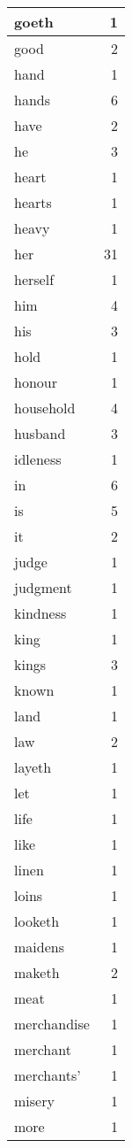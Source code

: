 \begin{center}
\begin{longtable}{l|r}
goeth & 1\\ \hline 
good & 2\\ \hline 
hand & 1\\ \hline 
hands & 6\\ \hline 
have & 2\\ \hline 
he & 3\\ \hline 
heart & 1\\ \hline 
hearts & 1\\ \hline 
heavy & 1\\ \hline 
her & 31\\ \hline 
herself & 1\\ \hline 
him & 4\\ \hline 
his & 3\\ \hline 
hold & 1\\ \hline 
honour & 1\\ \hline 
household & 4\\ \hline 
husband & 3\\ \hline 
idleness & 1\\ \hline 
in & 6\\ \hline 
is & 5\\ \hline 
it & 2\\ \hline 
judge & 1\\ \hline 
judgment & 1\\ \hline 
kindness & 1\\ \hline 
king & 1\\ \hline 
kings & 3\\ \hline 
known & 1\\ \hline 
land & 1\\ \hline 
law & 2\\ \hline 
layeth & 1\\ \hline 
let & 1\\ \hline 
life & 1\\ \hline 
like & 1\\ \hline 
linen & 1\\ \hline 
loins & 1\\ \hline 
looketh & 1\\ \hline 
maidens & 1\\ \hline 
maketh & 2\\ \hline 
meat & 1\\ \hline 
merchandise & 1\\ \hline 
merchant & 1\\ \hline 
merchants' & 1\\ \hline 
misery & 1\\ \hline 
more & 1\\ \hline 

\end{longtable}
\end{center}
